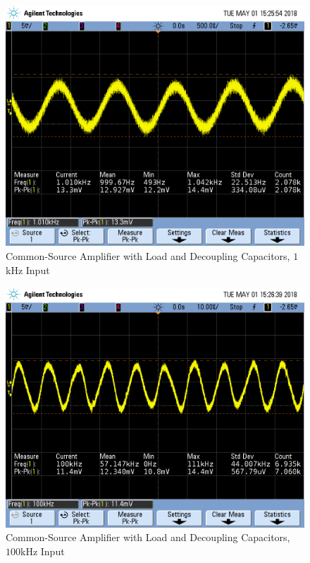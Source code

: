\begin{figure}[h!]
	\centering
	\includegraphics[scale=0.45]{./images/SCOPE_13.PNG}
	\caption{Common-Source Amplifier with Load and Decoupling Capacitors, $1$\si{\kilo\hertz} Input}
	\label{fig:SCOPE_13}
\end{figure}

\FloatBarrier

\begin{figure}[h!]
	\centering
	\includegraphics[scale=0.45]{./images/SCOPE_14.PNG}
	\caption{Common-Source Amplifier with Load and Decoupling Capacitors, $100$\si{\kilo\hertz} Input}
	\label{fig:SCOPE_14}
\end{figure}

